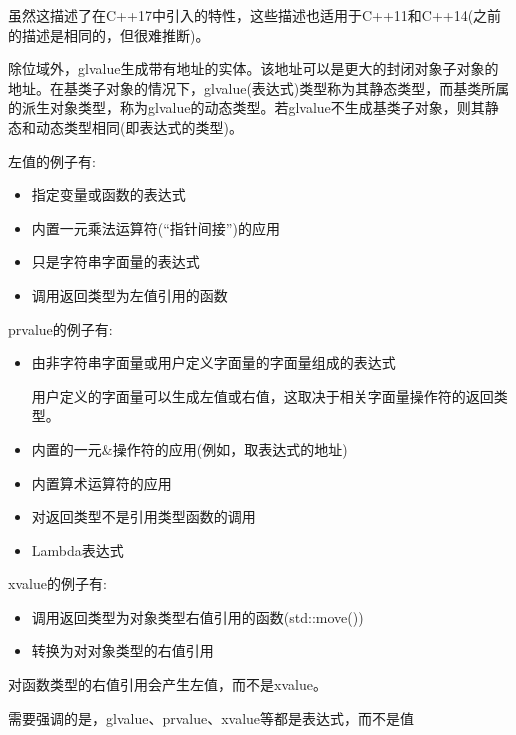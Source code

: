 虽然这描述了在C++17中引入的特性，这些描述也适用于C++11和C++14(之前的描述是相同的，但很难推断)。

除位域外，glvalue生成带有地址的实体。该地址可以是更大的封闭对象子对象的地址。在基类子对象的情况下，glvalue(表达式)类型称为其静态类型，而基类所属的派生对象类型，称为glvalue的动态类型。若glvalue不生成基类子对象，则其静态和动态类型相同(即表达式的类型)。

左值的例子有:

\begin{itemize}
\item 
指定变量或函数的表达式

\item 
内置一元乘法运算符(“指针间接”)的应用

\item 
只是字符串字面量的表达式

\item 
调用返回类型为左值引用的函数
\end{itemize}

prvalue的例子有:

\begin{itemize}
\item 
由非字符串字面量或用户定义字面量的字面量组成的表达式

\begin{notice}
用户定义的字面量可以生成左值或右值，这取决于相关字面量操作符的返回类型。
\end{notice}

\item 
内置的一元\&操作符的应用(例如，取表达式的地址)

\item 
内置算术运算符的应用

\item 
对返回类型不是引用类型函数的调用

\item 
Lambda表达式
\end{itemize}

xvalue的例子有:

\begin{itemize}
\item 
调用返回类型为对象类型右值引用的函数(std::move())

\item 
转换为对对象类型的右值引用
\end{itemize}

对函数类型的右值引用会产生左值，而不是xvalue。

需要强调的是，glvalue、prvalue、xvalue等都是表达式，而不是值

